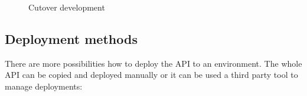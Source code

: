 \begin{figure}[htp] 
\caption{Cutover development}
\label{fig:cutover-development}
\end{figure}  


\subsection{Deployment methods}
There are more possibilities how to deploy the API to an environment. The whole API can be copied and deployed manually or it can be used a third party tool to manage deployments:

